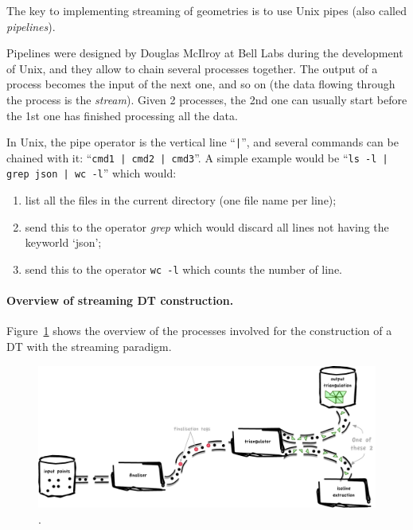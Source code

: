 \begin{floatbox}
\begin{kaobox-practice}[frametitle=\faCog\ Streaming is realised with Unix pipes]
  The key to implementing streaming of geometries is to use Unix pipes (also called \emph{pipelines}).

  Pipelines were designed by Douglas McIlroy at Bell Labs during the development of Unix, and they allow to chain several processes together. The output of a process becomes the input of the next one, and so on (the data flowing through the process is the \emph{stream}). Given 2 processes, the 2nd one can usually start before the 1st one has finished processing all the data.

  In Unix, the pipe operator is the vertical line ``\texttt{|}'', and several commands can be chained with it: ``\texttt{cmd1 | cmd2 | cmd3}''. 
  A simple example would be ``\texttt{ls -l | grep json | wc -l}'' which would:
  \begin{enumerate}
    \item list all the files in the current directory (one file name per line); 
    \item send this to the operator \emph{grep} which would discard all lines not having the keyworld `json'; 
    \item send this to the operator \texttt{wc -l} which counts the number of line.
   \end{enumerate} 
\end{kaobox-practice}
\end{floatbox}

\paragraph{Overview of streaming DT construction.}
Figure~\ref{fig:streamingdt} shows the overview of the processes involved for the construction of a DT with the streaming paradigm.
\begin{figure}
  \centering
  \includegraphics[width=\linewidth]{figs/streaming_pipeline}
  \caption{.}%
\label{fig:streamingdt}
\end{figure}

